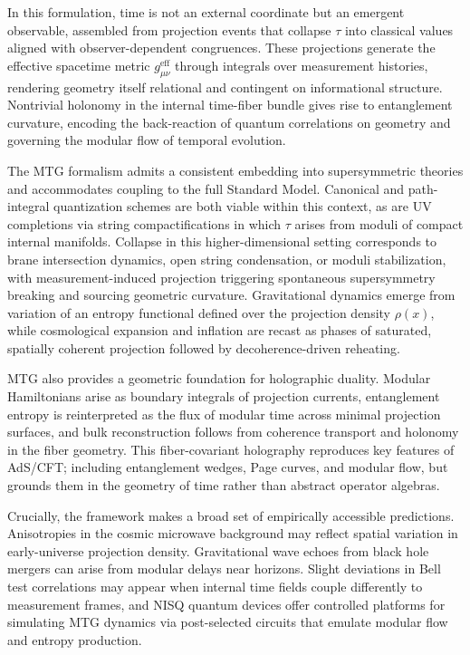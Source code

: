 \documentclass[11pt]{article}
\begin{document}
In this formulation, time is not an external coordinate but an emergent observable, assembled from projection events that collapse $\tau$ into classical values aligned with observer-dependent congruences. These projections generate the effective spacetime metric $g_{\mu\nu}^{\text{eff}}$ through integrals over measurement histories, rendering geometry itself relational and contingent on informational structure. Nontrivial holonomy in the internal time-fiber bundle gives rise to entanglement curvature, encoding the back-reaction of quantum correlations on geometry and governing the modular flow of temporal evolution.

The MTG formalism admits a consistent embedding into supersymmetric theories and accommodates coupling to the full Standard Model. Canonical and path-integral quantization schemes are both viable within this context, as are UV completions via string compactifications in which $\tau$ arises from moduli of compact internal manifolds. Collapse in this higher-dimensional setting corresponds to brane intersection dynamics, open string condensation, or moduli stabilization, with measurement-induced projection triggering spontaneous supersymmetry breaking and sourcing geometric curvature. Gravitational dynamics emerge from variation of an entropy functional defined over the projection density $\rho(x)$, while cosmological expansion and inflation are recast as phases of saturated, spatially coherent projection followed by decoherence-driven reheating.

MTG also provides a geometric foundation for holographic duality. Modular Hamiltonians arise as boundary integrals of projection currents, entanglement entropy is reinterpreted as the flux of modular time across minimal projection surfaces, and bulk reconstruction follows from coherence transport and holonomy in the fiber geometry. This fiber-covariant holography reproduces key features of AdS/CFT; including entanglement wedges, Page curves, and modular flow, but grounds them in the geometry of time rather than abstract operator algebras.

Crucially, the framework makes a broad set of empirically accessible predictions. Anisotropies in the cosmic microwave background may reflect spatial variation in early-universe projection density. Gravitational wave echoes from black hole mergers can arise from modular delays near horizons. Slight deviations in Bell test correlations may appear when internal time fields couple differently to measurement frames, and NISQ quantum devices offer controlled platforms for simulating MTG dynamics via post-selected circuits that emulate modular flow and entropy production.
\end{document}

